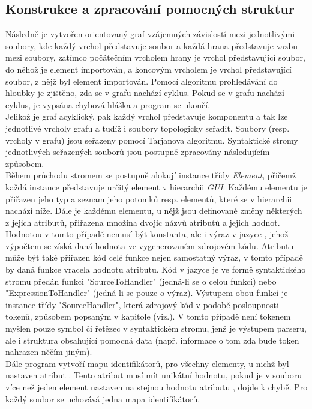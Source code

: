 \documentclass[11pt,twoside,a4paper]{book}
\begin{document}
{{\begin{ttemize}
{{\begin{lastlisting}[frame=single,caption=Řešení v pseudokódu problematického použití operátoru "." v přiřazovacím výroku,label=lst:var0N]
\subsection{Konstrukce a zpracování pomocných struktur}
Následně je vytvořen orientovaný graf vzájemných závislostí mezi jednotlivými soubory, kde každý vrchol představuje soubor a každá hrana představuje vazbu mezi soubory, zatímco počátečním vrcholem hrany je vrchol představující soubor, do něhož je element importován, a koncovým vrcholem je vrchol představující soubor, z nějž byl element importován. Pomocí algoritmu prohledávání do hloubky je zjištěno, zda se v grafu nachází cyklus. Pokud se v grafu nachází cyklus, je vypsána chybová hláška a program se ukončí.\\
Jelikož je graf acyklický, pak každý vrchol představuje komponentu a tak lze jednotlivé vrcholy grafu a tudíž i soubory topologicky seřadit. Soubory (resp. vrcholy v grafu) jsou seřazeny pomocí Tarjanova algoritmu. Syntaktické stromy jednotlivých seřazených souborů jsou postupně zpracovány následujícím způsobem.\\
Během průchodu stromem se postupně alokují instance třídy \textit{Element}, přičemž každá instance představuje určitý element v hierarchii \textit{GUI}. Každému elementu je přiřazen jeho typ a seznam jeho potomků resp. elementů, které se v hierarchii nachází níže. Dále je každému elementu, u nějž jsou definované změny některých z jejich atributů, přiřazena množina dvojic názvů atributů a jejich hodnot. Hodnotou v tomto případě nemusí být konstanta, ale i výraz v jazyce , jehož výpočtem se získá daná hodnota ve vygenerovaném zdrojovém kódu. Atributu může být také přiřazen kód celé funkce nejen samostatný výraz, v tomto případě by daná funkce vracela hodnotu atributu. Kód v jazyce  je ve formě syntaktického stromu předán funkci "SourceToHandler" (jedná-li se o celou funkci) nebo "ExpressionToHandler" (jedná-li se pouze o výraz). Výstupem obou funkcí je instance třídy "SourceHandler", která zdrojový kód v podobě posloupnosti tokenů, způsobem popsaným v kapitole (viz.). V tomto případě není tokenem myšlen pouze symbol či řetězec v syntaktickém stromu, jenž je výstupem parseru, ale i struktura obsahující pomocná data (např. informace o tom zda bude token nahrazen něčím jiným).\\
Dále program vytvoří mapu identifikátorů, pro všechny elementy, u nichž byl nastaven atribut . Tento atribut musí mít unikátní hodnotu, pokud je v souboru více než jeden element nastaven na stejnou hodnotu atributu , dojde k chybě. Pro každý soubor se uchovává jedna mapa identifikátorů.\\

\end{lastlisting}}}
\end{ttemize}}}
\end{document}
